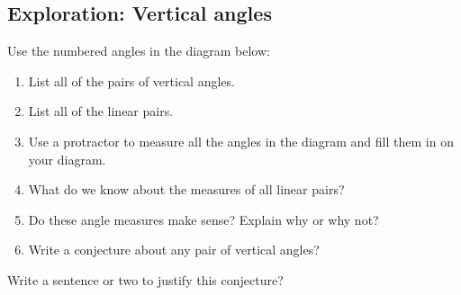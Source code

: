 \newpage

\subsection{Exploration: Vertical angles}

Use the numbered angles in the diagram below:

\begin{enumerate}
\item List all of the pairs of vertical angles.
\item List all of the linear pairs.
\smallskip
 

	\begin{center}
	\end{center}
	
\item Use a protractor to measure all the angles in the diagram and fill them in on your diagram.	

\item What do we know about the measures of all linear pairs?
\medskip

\item Do these angle measures make sense?  Explain why or why not?
\bigskip

\item Write a conjecture about any pair of vertical angles?  
\medskip
\end{enumerate}

\noindent \aq Write a sentence or two to justify this conjecture?
\bigskip
\newpage


